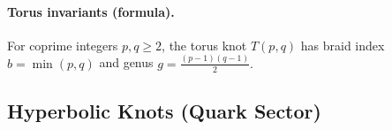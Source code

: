             \paragraph{Torus invariants (formula).}
                For coprime integers $p,q\ge 2$, the torus knot $T(p,q)$ has braid index
                $b=\min(p,q)$ and genus
                \(
                g=\frac{(p-1)(q-1)}{2}.
                \)

    \subsection*{Hyperbolic Knots (Quark Sector)}

        \begin{table}[H]
            \centering
            \footnotesize
            \setlength{\tabcolsep}{3pt}
            \renewcommand{\arraystretch}{0.9}

            \caption{Hyperbolic knots (quark sector) with SST symmetry data.}
            \label{tab:hyperbolic-quark}


\end{table}

